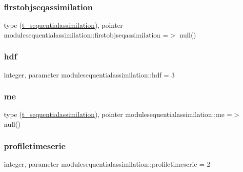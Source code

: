 \subsubsection{\texorpdfstring{firstobjseqassimilation}{firstobjseqassimilation}}
{\footnotesize\ttfamily type (\mbox{\hyperlink{structmodulesequentialassimilation_1_1t__sequentialassimilation}{t\+\_\+sequentialassimilation}}), pointer modulesequentialassimilation\+::firstobjseqassimilation =$>$ null()\hspace{0.3cm}{\ttfamily [private]}}

\mbox{\label{namespacemodulesequentialassimilation_af5f287d70e177aabed0e646fcd67dd61}} 
\subsubsection{\texorpdfstring{hdf}{hdf}}
{\footnotesize\ttfamily integer, parameter modulesequentialassimilation\+::hdf = 3\hspace{0.3cm}{\ttfamily [private]}}

\mbox{\label{namespacemodulesequentialassimilation_afebfebdaf1bfbc40b82684dd17f50357}} 
\subsubsection{\texorpdfstring{me}{me}}
{\footnotesize\ttfamily type (\mbox{\hyperlink{structmodulesequentialassimilation_1_1t__sequentialassimilation}{t\+\_\+sequentialassimilation}}), pointer modulesequentialassimilation\+::me =$>$ null()\hspace{0.3cm}{\ttfamily [private]}}

\mbox{\label{namespacemodulesequentialassimilation_a9f871dcd1917128408934c12201b788f}} 
\subsubsection{\texorpdfstring{profiletimeserie}{profiletimeserie}}
{\footnotesize\ttfamily integer, parameter modulesequentialassimilation\+::profiletimeserie = 2\hspace{0.3cm}{\ttfamily [private]}}


